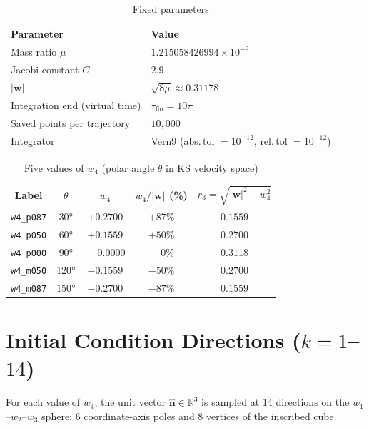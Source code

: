\documentclass[a4paper,11pt]{article}
\begin{document}
\begin{table}[H]
  \centering
  \caption{Fixed parameters}
  \begin{tabular}{ll}
    \toprule
    Parameter & Value \\
    \midrule
    Mass ratio $\mu$ & $1.215058426994 \times 10^{-2}$ \\
    Jacobi constant $C$ & $2.9$ \\
    $|\boldsymbol{w}|$ & $\sqrt{8\mu} \approx 0.31178$ \\
    Integration end (virtual time) & $\tau_{\mathrm{fin}} = 10\pi$ \\
    Saved points per trajectory & $10{,}000$ \\
    Integrator & Vern9 (abs.\,tol $= 10^{-12}$, rel.\,tol $= 10^{-12}$) \\
    \bottomrule
  \end{tabular}
\end{table}

\begin{table}[H]
  \centering
  \caption{Five values of $w_4$ (polar angle $\theta$ in KS velocity space)}
  \begin{tabular}{ccccc}
    \toprule
    Label & $\theta$ & $w_4$ & $w_4/|\boldsymbol{w}|$ (\%) &
    $r_3 = \sqrt{|\boldsymbol{w}|^2 - w_4^2}$ \\
    \midrule
    \texttt{w4\_p087} & $30°$ & $+0.2700$ & $+87\%$ & $0.1559$ \\
    \texttt{w4\_p050} & $60°$ & $+0.1559$ & $+50\%$ & $0.2700$ \\
    \texttt{w4\_p000} & $90°$ & $\phantom{+}0.0000$ & $\phantom{+}0\%$ & $0.3118$ \\
    \texttt{w4\_m050} & $120°$ & $-0.1559$ & $-50\%$ & $0.2700$ \\
    \texttt{w4\_m087} & $150°$ & $-0.2700$ & $-87\%$ & $0.1559$ \\
    \bottomrule
  \end{tabular}
\end{table}

\section{Initial Condition Directions ($k = 1$--$14$)}
\label{sec:dirs}

For each value of $w_4$, the unit vector
$\hat{\boldsymbol{n}} \in \mathbb{R}^3$ is sampled at 14 directions
on the $w_1$--$w_2$--$w_3$ sphere:
6 coordinate-axis poles and 8 vertices of the inscribed cube.
\end{document}
